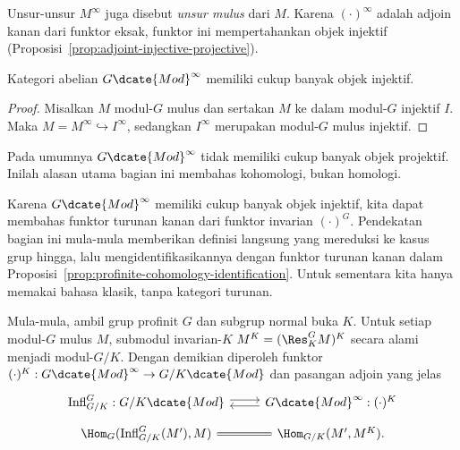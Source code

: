 Unsur-unsur $M^\infty$ juga disebut \emph{unsur mulus} dari $M$. Karena
$(\cdot)^\infty$ adalah adjoin kanan dari funktor eksak, funktor ini
mempertahankan objek injektif
(Proposisi~\ref{prop:adjoint-injective-projective}).

\begin{corollary}
	Kategori abelian $G\dcate{Mod}^\infty$ memiliki cukup banyak objek
	injektif.
\end{corollary}
\begin{proof}
	Misalkan $M$ modul-$G$ mulus dan sertakan $M$ ke dalam modul-$G$ injektif
	$I$. Maka $M=M^\infty\hookrightarrow I^\infty$, sedangkan $I^\infty$
	merupakan modul-$G$ mulus injektif.
\end{proof}

\begin{remark}
	Pada umumnya $G\dcate{Mod}^\infty$ tidak memiliki cukup banyak objek
	projektif. Inilah alasan utama bagian ini membahas kohomologi, bukan homologi.
\end{remark}

Karena $G\dcate{Mod}^\infty$ memiliki cukup banyak objek injektif, kita dapat
membahas funktor turunan kanan dari funktor invarian $(\cdot)^G$. Pendekatan
bagian ini mula-mula memberikan definisi langsung yang mereduksi ke kasus grup
hingga, lalu mengidentifikasikannya dengan funktor turunan kanan dalam
Proposisi~\ref{prop:profinite-cohomology-identification}. Untuk sementara kita
hanya memakai bahasa klasik, tanpa kategori turunan.

Mula-mula, ambil grup profinit $G$ dan subgrup normal buka $K$. Untuk setiap
modul-$G$ mulus $M$, submodul invarian-$K$
$M^K=(\Res^G_KM)^K$ secara alami menjadi modul-$G/K$. Dengan demikian
diperoleh funktor $(\cdot)^K:G\dcate{Mod}^\infty\to G/K\dcate{Mod}$ dan
pasangan adjoin yang jelas
\begin{equation}\label{eqn:invariant-adjunction-profinite}
	\begin{tikzcd}[row sep=tiny]
		\mathrm{Infl}^G_{G/K}:G/K\dcate{Mod} \arrow[shift left,r] &
		G\dcate{Mod}^\infty:(\cdot)^K \arrow[shift left,l]\\
		\Hom_G(\mathrm{Infl}^G_{G/K}(M'),M) \arrow[equal,r] &
		\Hom_{G/K}(M',M^K).
	\end{tikzcd}
\end{equation}

